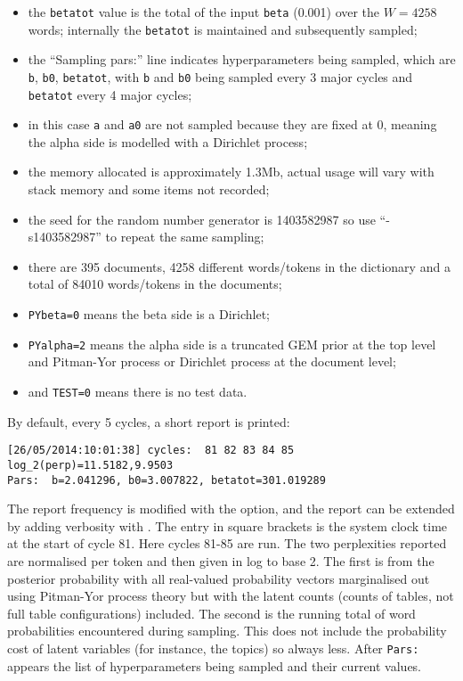\documentclass[a4paper,english]{article}
\begin{document}
\begin{itemize}
\item
the \texttt{betatot} value is the total of the input
\texttt{beta} (0.001) over the $W=4258$ words;
internally the \texttt{betatot} is maintained and subsequently
sampled;
\item
the ``Sampling pars:'' line indicates
hyperparameters being sampled, which  are 
\texttt{b}, \texttt{b0}, \texttt{betatot}, with
\texttt{b} and \texttt{b0} being sampled every 3 major cycles and \texttt{betatot}
every 4 major cycles;
\item
in this case \texttt{a} and \texttt{a0} are not sampled because they are fixed at 0,
meaning the alpha side is modelled with a Dirichlet process;
\item
the memory allocated is approximately 1.3Mb,
actual usage will vary with stack memory and some items not recorded;
\item
the seed for the random number generator is 1403582987
so use ``-s1403582987'' to repeat the same sampling;
\item
there are 395 documents, 4258 different words/tokens in the dictionary and
a total of 84010 words/tokens in the documents;
\item
\texttt{PYbeta=0} means the beta side is a Dirichlet;
\item
\texttt{PYalpha=2}  means the alpha side is a truncated GEM prior at the top
level and Pitman-Yor process or Dirichlet process at the document level;
\item
and \texttt{TEST=0} means there is no test data.
\end{itemize}
By default, every 5 cycles, a short report is printed:
\begin{verbatim}
[26/05/2014:10:01:38] cycles:  81 82 83 84 85
log_2(perp)=11.5182,9.9503
Pars:  b=2.041296, b0=3.007822, betatot=301.019289
\end{verbatim}
The report frequency is modified with the 
option, and the report can be extended by adding verbosity with 
 .  The entry in square brackets is the system clock time
at the start of cycle 81.
Here cycles 81-85 are run.
The two perplexities reported are normalised per token and then given in
log to base 2.  The first is from the posterior probability with all
real-valued probability vectors marginalised out using Pitman-Yor process
theory but with the latent counts
(counts of tables, not full table configurations) included.
The second is the running total of word probabilities encountered
during sampling.  This does not include the probability cost of latent
variables (for instance, the topics) so always less.
After \texttt{Pars:} appears the list of hyperparameters being sampled and their
current values.  
\end{document}
